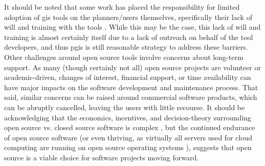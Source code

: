 \documentclass[notitlepage]{article}
\begin{document}
It should be noted that some work has placed the responsibility for limited adoption of \ac{gis} tools on the planners/users themselves, specifically their lack of will and training with the tools \cite{gocmenBarriersGISUse2010}. While this may be the case, this lack of will and training is almost certainly itself due to a lack of outreach on behalf of the tool developers, and thus \ac{pgis} is still reasonable strategy to address these barriers. Other challenges around open source tools involve concerns about long-term support. As many (though certainly not all) open source projects are volunteer or academic-driven, changes of interest, financial support, or time availability can have major impacts on the software development and maintenance process. That said, similar concerns can be raised around commercial software products, which can be abruptly cancelled, leaving the users with little recourse. It should be acknowledging that the economics, incentives, and decision-theory surrounding open source vs. closed source software is complex \cite{lernerSimpleEconomicsOpen2002}, but the continued endurance of open source software (or even thriving, as virtually all servers used for cloud computing are running on open source operating systems \cite{vermaUbuntuLinuxMost2015}), suggests that open source is a viable choice for software projects moving forward. 


%
%
\end{document}
